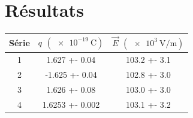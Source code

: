 \section{Résultats} \label{sec:resultats}

\lipsum[54]

\begin{Figure}
\centering
{}
\label{tab:resultats}
\begin{tabular}{
    c|
    S[table-format=-2.3(1.3)]
    S[table-format=6(5)]
}
\toprule
\toprule
{Série} & {$q$ $(\SI{e-19}{\coulomb})$} & {$\vec E$ $(\SI{e3}{\volt\per\meter})$} \\
   & 1.627 +- 0.04     & 103.2 +- 3.1  \\
    2   & -1.625 +- 0.04    & 102.8 +- 3.0 \\
    3   & 1.626 +- 0.08     & 103.0 +- 3.0 \\
    4   & 1.6253 +- 0.002   & 103.1 +- 3.2  \\
\midrule
\midrule
\end{tabular}
\end{Figure}
